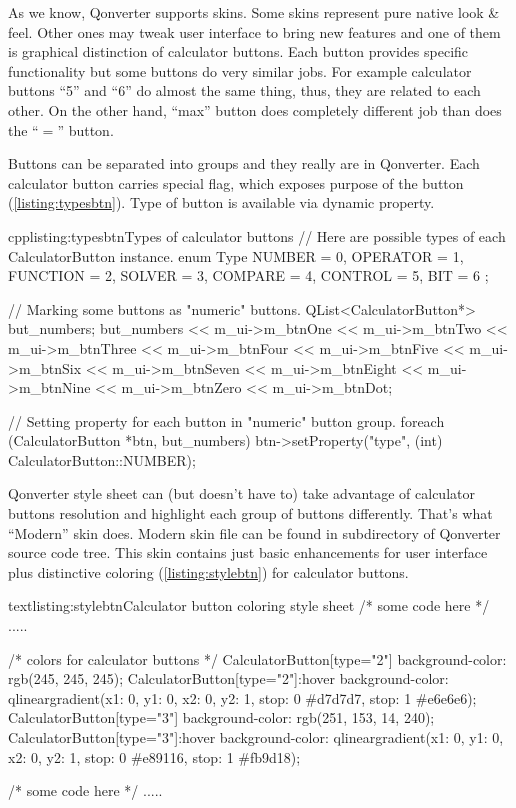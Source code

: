 As we know, Qonverter supports skins. Some skins represent pure native look \& feel. Other ones may tweak user interface to bring new features and one of them is graphical distinction of calculator buttons. Each button provides specific functionality but some buttons do very similar jobs. For example calculator buttons \enquote{5} and \enquote{6} do almost the same thing, thus, they are related to each other. On the other hand, \enquote{max} button does completely different job than does the \enquote{$=$} button.

Buttons can be separated into groups and they really are in Qonverter. Each calculator button carries special flag, which exposes purpose of the button (\autoref{listing:typesbtn}). Type of button is available via dynamic property.
\begin{fdoccode}{cpp}{listing:typesbtn}{Types of calculator buttons}
// Here are possible types of each CalculatorButton instance.
enum Type {
    NUMBER	= 0,
    OPERATOR	= 1,
    FUNCTION	= 2,
    SOLVER	= 3,
    COMPARE	= 4,
    CONTROL	= 5,
    BIT		= 6
};

// Marking some buttons as "numeric" buttons.
QList<CalculatorButton*> but_numbers;
but_numbers <<	m_ui->m_btnOne << m_ui->m_btnTwo <<
				m_ui->m_btnThree << m_ui->m_btnFour <<
				m_ui->m_btnFive << m_ui->m_btnSix <<
				m_ui->m_btnSeven << m_ui->m_btnEight <<
				m_ui->m_btnNine << m_ui->m_btnZero <<
				m_ui->m_btnDot;

// Setting property for each button in "numeric" button group.
foreach (CalculatorButton *btn, but_numbers) {
	btn->setProperty("type", (int) CalculatorButton::NUMBER);
}
\end{fdoccode}

Qonverter style sheet can (but doesn't have to) take advantage of calculator buttons resolution and highlight each group of buttons differently. That's what \enquote{Modern} skin does. Modern skin file can be found in subdirectory of Qonverter source code tree. This skin contains just basic enhancements for user interface plus distinctive coloring (\autoref{listing:stylebtn}) for calculator buttons.
\begin{fdoccode}{text}{listing:stylebtn}{Calculator button coloring style sheet}
/* some code here */
.....

/* colors for calculator buttons */
CalculatorButton[type="2"] {
    background-color: rgb(245, 245, 245);
}
CalculatorButton[type="2"]:hover {
    background-color: qlineargradient(x1: 0, y1: 0, x2: 0, y2: 1, stop: 0 #d7d7d7, stop: 1 #e6e6e6);
}
CalculatorButton[type="3"] {
    background-color: rgb(251, 153, 14, 240);
}
CalculatorButton[type="3"]:hover {
    background-color: qlineargradient(x1: 0, y1: 0, x2: 0, y2: 1, stop: 0 #e89116, stop: 1 #fb9d18);
}

/* some code here */
.....
\end{fdoccode}

